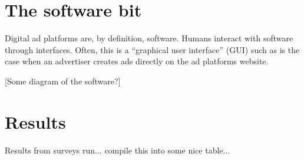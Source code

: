 \message{ !name(survey-sampling-with-ads.tex)}\documentclass[a4paper,12pt]{article}
\theoremstyle{proposition}
\begin{document}


%




\section{The software bit}

Digital ad platforms are, by definition, software. Humans interact with software through interfaces. Often, this is a ``graphical user interface'' (GUI) such as is the case when an advertiser creates ads directly on the ad platforms website.




[Some diagram of the software?]


\section{Results}


%
%
%
Results from surveys run... compile this into some nice table...
\end{document}
